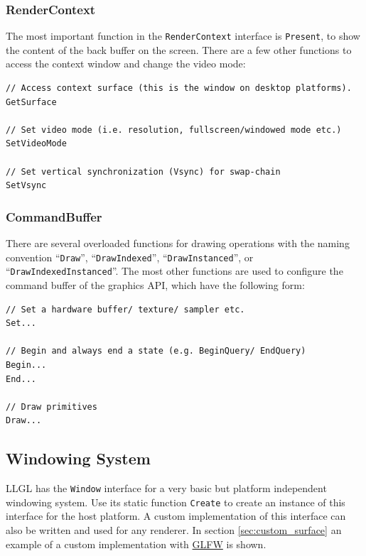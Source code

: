 \documentclass{article}
\begin{document}
\subsubsection{RenderContext}

The most important function in the \texttt{RenderContext} interface is \texttt{Present},
to show the content of the back buffer on the screen.
There are a few other functions to access the context window and change the video mode:
\begin{lstlisting}
// Access context surface (this is the window on desktop platforms).
GetSurface

// Set video mode (i.e. resolution, fullscreen/windowed mode etc.)
SetVideoMode

// Set vertical synchronization (Vsync) for swap-chain
SetVsync
\end{lstlisting}

\subsubsection{CommandBuffer}

There are several overloaded functions for drawing operations with the naming convention
``\texttt{Draw}'', ``\texttt{DrawIndexed}'', ``\texttt{DrawInstanced}'', or ``\texttt{DrawIndexedInstanced}''.
The most other functions are used to configure the command buffer of the graphics API, which have the following form:
\begin{lstlisting}
// Set a hardware buffer/ texture/ sampler etc.
Set...

// Begin and always end a state (e.g. BeginQuery/ EndQuery)
Begin...
End...

// Draw primitives
Draw...
\end{lstlisting}

\subsection{Windowing System}

LLGL has the \texttt{Window} interface for a very basic but platform independent windowing system.
Use its static function \texttt{Create} to create an instance of this interface for the host platform.
A custom implementation of this interface can also be written and used for any renderer.
In section \ref{sec:custom_surface} an example of a custom implementation with \href{http://www.glfw.org/}{GLFW} is shown.


\end{document}
